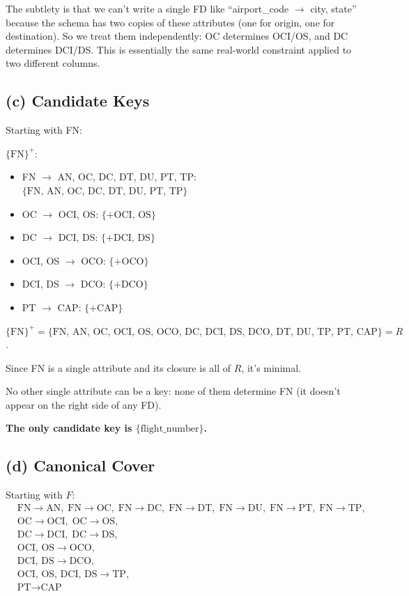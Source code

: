 \documentclass[11pt]{article}
\begin{document}
The subtlety is that we can't write a single FD like ``airport\_code $\to$ city, state'' because the schema has two copies of these attributes (one for origin, one for destination). So we treat them independently: OC determines OCI/OS, and DC determines DCI/DS. This is essentially the same real-world constraint applied to two different columns.

\subsection{(c) Candidate Keys}

Starting with FN:

$\{\text{FN}\}^+$:
\begin{itemize}
  \item FN $\to$ AN, OC, DC, DT, DU, PT, TP: $\{\text{FN, AN, OC, DC, DT, DU, PT, TP}\}$
  \item OC $\to$ OCI, OS: $\{+ \text{OCI, OS}\}$
  \item DC $\to$ DCI, DS: $\{+ \text{DCI, DS}\}$
  \item OCI, OS $\to$ OCO: $\{+ \text{OCO}\}$
  \item DCI, DS $\to$ DCO: $\{+ \text{DCO}\}$
  \item PT $\to$ CAP: $\{+ \text{CAP}\}$
\end{itemize}

$\{\text{FN}\}^+ = \{\text{FN, AN, OC, OCI, OS, OCO, DC, DCI, DS, DCO, DT, DU, TP, PT, CAP}\} = R$.

Since FN is a single attribute and its closure is all of $R$, it's minimal.

No other single attribute can be a key: none of them determine FN (it doesn't appear on the right side of any FD).

\medskip
\noindent\textbf{The only candidate key is $\boxed{\{\text{flight\_number}\}}$.}

\subsection{(d) Canonical Cover}

Starting with $F$:
\begin{align*}
&\text{FN} \to \text{AN},\; \text{FN} \to \text{OC},\; \text{FN} \to \text{DC},\; \text{FN} \to \text{DT},\; \text{FN} \to \text{DU},\; \text{FN} \to \text{PT},\; \text{FN} \to \text{TP}, \\
&\text{OC} \to \text{OCI},\; \text{OC} \to \text{OS}, \\
&\text{DC} \to \text{DCI},\; \text{DC} \to \text{DS}, \\
&\text{OCI, OS} \to \text{OCO}, \\
&\text{DCI, DS} \to \text{DCO}, \\
&\text{OCI, OS, DCI, DS} \to \text{TP}, \\
&\text{PT} \to \text{CAP}
\end{align*}
\end{document}
